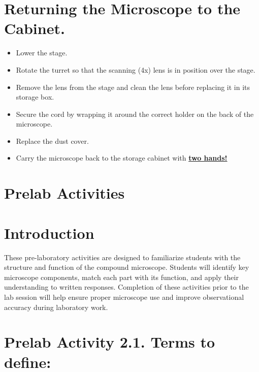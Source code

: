 \documentclass[
  letterpaper,
  DIV=11,
  numbers=noendperiod]{scrreprt}
\begin{document}
\section{\texorpdfstring{\textbf{Returning the Microscope to the
Cabinet.}}{Returning the Microscope to the Cabinet.}}\label{returning-the-microscope-to-the-cabinet.}

\begin{itemize}
\item
  Lower the stage.
\item
  Rotate the turret so that the scanning (4x) lens is in position over
  the stage.
\item
  Remove the lens from the stage and clean the lens before replacing it
  in its storage box.
\item
  Secure the cord by wrapping it around the correct holder on the back
  of the microscope.
\item
  Replace the dust cover.
\item
  Carry the microscope back to the storage cabinet with \ul{\textbf{two
  hands!}}
\end{itemize}

\section{\texorpdfstring{\textbf{Prelab
Activities}}{Prelab Activities}}\label{prelab-activities}

\section{\texorpdfstring{\textbf{Introduction}}{Introduction}}\label{introduction-1}

These pre-laboratory activities are designed to familiarize students
with the structure and function of the compound microscope. Students
will identify key microscope components, match each part with its
function, and apply their understanding to written responses. Completion
of these activities prior to the lab session will help ensure proper
microscope use and improve observational accuracy during laboratory
work.

\section{\texorpdfstring{\textbf{Prelab Activity 2.1. Terms to
define:}}{Prelab Activity 2.1. Terms to define:}}\label{prelab-activity-2.1.-terms-to-define}
\end{document}
